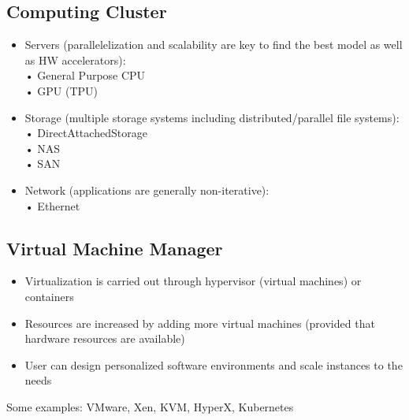 \documentclass[10pt, oneside]{article}
\begin{document}
\begin{multicols}{2}
    \subsection{Computing Cluster}
    \begin{itemize}
        \item Servers (parallelelization and scalability are key to find the best model as well as HW accelerators):\\
        • General Purpose CPU\\
        • GPU (TPU)
        \item Storage (multiple storage systems including
        distributed/parallel file systems):\\
        • DirectAttachedStorage\\
        • NAS\\
        • SAN\\
        \item Network (applications are generally non-iterative):\\ • Ethernet
    \end{itemize}
    \subsection{Virtual Machine Manager}\begin{itemize}
        \item Virtualization is carried out through hypervisor (virtual machines) or containers
        \item Resources are increased by adding more virtual machines (provided that hardware resources are available)
        \item User can design personalized software environments and scale instances to the needs
    \end{itemize}Some examples: VMware, Xen, KVM, HyperX, Kubernetes
    \columnbreak

\end{multicols}
\end{document}
